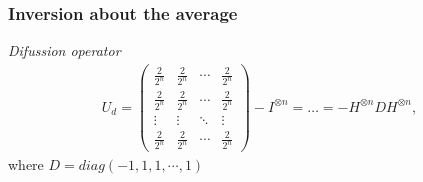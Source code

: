 \begin{frame}
	\frametitle{Inversion about the average}
	\begin{block}{\textit{Difussion operator}}
		\begin{eqnarray}
			U_{d}=\left(\begin{array}{cccc}
			\frac{2}{2^{n}} & \frac{2}{2^{n}} & \cdots & \frac{2}{2^{n}}\\
			\frac{2}{2^{n}} & \frac{2}{2^{n}} & \cdots & \frac{2}{2^{n}}\\
			\vdots & \vdots & \ddots & \vdots\\
			\frac{2}{2^{n}} & \frac{2}{2^{n}} & \cdots & \frac{2}{2^{n}}
			\end{array}\right)-I^{\otimes n}=\dots=-H^{\otimes n}DH^{\otimes n},
		\end{eqnarray}
		where $D=diag\left(-1,1,1,\cdots,1\right)$
	\end{block}
\end{frame}


